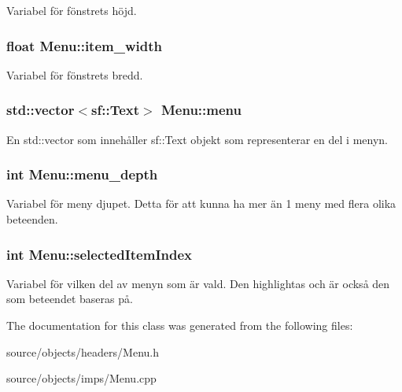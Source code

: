 Variabel för fönstrets höjd. 

\hypertarget{classMenu_a8dd7434d066c508cb0bc6b7a16d3896c}{
\subsubsection[{item\+\_\+width}]{\setlength{\rightskip}{0pt plus 5cm}float Menu\+::item\+\_\+width\hspace{0.3cm}{\ttfamily [private]}}}\label{classMenu_a8dd7434d066c508cb0bc6b7a16d3896c}


Variabel för fönstrets bredd. 

\hypertarget{classMenu_ae0638a87425d6d01ce8b5c3508e4a642}{
\subsubsection[{menu}]{\setlength{\rightskip}{0pt plus 5cm}std\+::vector$<$sf\+::\+Text$>$ Menu\+::menu\hspace{0.3cm}{\ttfamily [private]}}}\label{classMenu_ae0638a87425d6d01ce8b5c3508e4a642}
En std\+::vector som innehåller sf\+::\+Text objekt som representerar en del i menyn. \hypertarget{classMenu_a0b9b3614aefa98bd42a9c54984784f15}{
\subsubsection[{menu\+\_\+depth}]{\setlength{\rightskip}{0pt plus 5cm}int Menu\+::menu\+\_\+depth\hspace{0.3cm}{\ttfamily [private]}}}\label{classMenu_a0b9b3614aefa98bd42a9c54984784f15}
Variabel för meny djupet. Detta för att kunna ha mer än 1 meny med flera olika beteenden. \hypertarget{classMenu_a464ef16fd28c0df35ee1d9f78c0ef895}{
\subsubsection[{selected\+Item\+Index}]{\setlength{\rightskip}{0pt plus 5cm}int Menu\+::selected\+Item\+Index\hspace{0.3cm}{\ttfamily [private]}}}\label{classMenu_a464ef16fd28c0df35ee1d9f78c0ef895}
Variabel för vilken del av menyn som är vald. Den highlightas och är också den som beteendet baseras på. 

The documentation for this class was generated from the following files\+:\begin{DoxyCompactItemize}
\item 
source/objects/headers/Menu.\+h\item 
source/objects/imps/Menu.\+cpp\end{DoxyCompactItemize}
